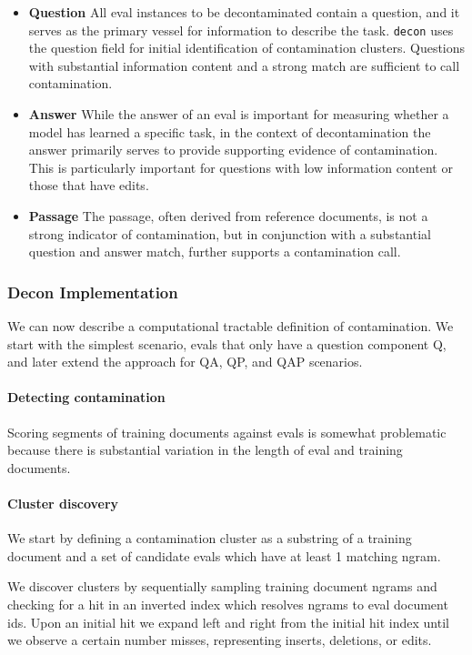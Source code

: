 \documentclass[table]{ai2style/ai2}
\begin{document}
{{\begin{itemize}
    \item {\bf{Question}} All eval instances to be decontaminated contain a question, and it serves as the primary vessel for information to describe the task. \texttt{decon} uses the question field for initial identification of contamination clusters. Questions with substantial information content and a strong match are sufficient to call contamination.
    \item {\bf{Answer}} While the answer of an eval is important for measuring whether a model has learned a specific task, in the context of decontamination the answer primarily serves to provide supporting evidence of contamination. This is particularly important for questions with low information content or those that have edits.
    \item {\bf{Passage}} The passage, often derived from reference documents, is not a strong indicator of contamination, but in conjunction with a substantial question and answer match, further supports a contamination call.
\end{itemize}

\subsubsection{Decon Implementation}

We can now describe a computational tractable definition of contamination.
We start with the simplest scenario, evals that only have a question component Q, and later extend the approach for QA, QP, and QAP scenarios.

\paragraph{Detecting contamination} Scoring segments of training documents against evals is somewhat problematic because there is substantial variation in the length of eval and training documents.

\paragraph{Cluster discovery} We start by defining a contamination cluster as a substring of a training document and a set of candidate evals which have at least 1 matching ngram.

We discover clusters by sequentially sampling training document ngrams and checking for a hit in an inverted index which resolves ngrams to eval document ids. Upon an initial hit we expand left and right from the initial hit index until we observe a certain number misses, representing inserts, deletions, or edits.

}}
\end{document}
